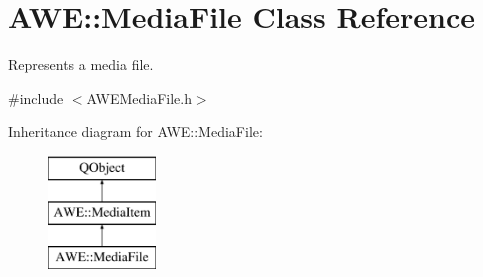 \hypertarget{class_a_w_e_1_1_media_file}{\section{A\-W\-E\-:\-:Media\-File Class Reference}
\label{class_a_w_e_1_1_media_file}
}


Represents a media file.  




{\ttfamily \#include $<$A\-W\-E\-Media\-File.\-h$>$}

Inheritance diagram for A\-W\-E\-:\-:Media\-File\-:\begin{figure}[H]
\begin{center}
\leavevmode
\includegraphics[height=3.000000cm]{class_a_w_e_1_1_media_file}
\end{center}
\end{figure}
